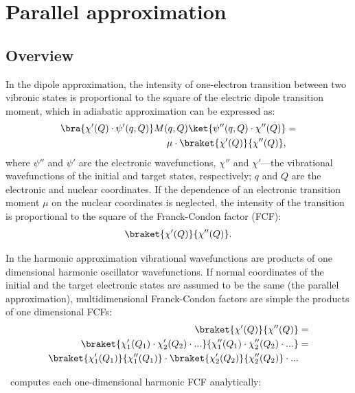 \documentclass[11pt]{article}
\begin{document}
\section{Parallel approximation}
\label{sec:parallel}

\subsection{Overview}
\label{sec:para:overview}

In the dipole approximation, the intensity of one-electron transition between two vibronic states
is proportional to the square of the electric dipole transition moment, which
in adiabatic approximation can be expressed as:
\begin{align}
\bra{\chi '(Q)\cdot\psi'(q,Q)} M(q,Q) \ket{\psi''(q,Q)\cdot\chi''(Q)} & = \nonumber\\
\mu \cdot \braket{\chi '(Q)}{\chi ''(Q)}, & 
\end{align}
where
$\psi''$ and $\psi'$ are the electronic wavefunctions, $\chi''$ and $\chi'$---the vibrational wavefunctions
of the initial and target states, respectively;
$q$ and $Q$ are the electronic and nuclear coordinates.
If the dependence 
of an electronic transition moment $\mu$  on the nuclear coordinates is neglected,
the intensity of the transition is proportional to the square of the 
Franck-Condon factor (FCF)\cite{Franck:25,Condon:26}:
\begin{align}
\braket{\chi '(Q)}{\chi ''(Q)}.
\end{align}

In the harmonic approximation vibrational wavefunctions are products of
one dimensional harmonic oscillator wavefunctions. 
If normal coordinates of the initial and the target electronic states are assumed to be the same
(the parallel approximation),
multidimensional Franck-Condon factors are simple the products of one dimensional FCFs:
\begin{align}
\braket{\chi'(Q)}{\chi''(Q)}&=\nonumber\\
\braket{\chi'_1(Q_1)\cdot\chi'_2(Q_2)\cdot...}{\chi''_1(Q_1)\cdot\chi''_2(Q_2)\cdot...}&=\nonumber\\
\braket{\chi'_1(Q_1)}{\chi''_1(Q_1)}\cdot\braket{\chi'_2(Q_2)}{\chi''_2(Q_2)}\cdot...&
\label{eq:product_fcf}
\end{align}

\ezFCF\ computes each one-dimensional harmonic FCF analytically\cite{FranckCondon:Math:30}:
\end{document}
